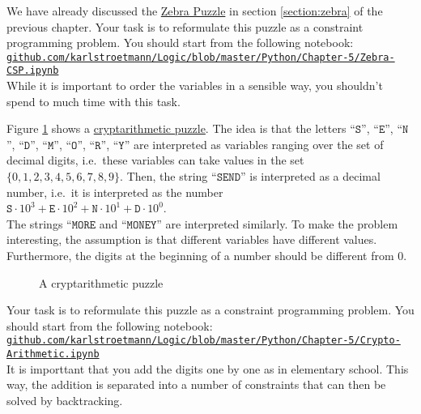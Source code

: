 \exerciseEng
We have already discussed the \href{https://en.wikipedia.org/wiki/Zebra_puzzle}{Zebra Puzzle} in section
\ref{section:zebra} of the previous chapter.  Your task is to reformulate this puzzle as a constraint
programming problem.  You should start from the following notebook:
\\[0.2cm]
\hspace*{1.3cm}
\href{https://github.com/karlstroetmann/Logic/blob/master/Python/Chapter-4/Prince-Tiger.ipynb}{\texttt{github.com/karlstroetmann/Logic/blob/master/Python/Chapter-5/Zebra-CSP.ipynb}}
\\[0.2cm]
While it is important to order the variables in a sensible way, you shouldn't spend to much time with this
task.
\eox

\exerciseEng
Figure \ref{fig:send-more-money.pdf} shows a
\href{https://en.wikipedia.org/wiki/Verbal_arithmetic}{cryptarithmetic puzzle}.
The idea is that the letters 
``$\texttt{S}$'', ``$\texttt{E}$'', ``$\texttt{N}$'', ``$\texttt{D}$'', ``$\texttt{M}$'', ``$\texttt{O}$'', ``$\texttt{R}$'', ``$\texttt{Y}$'' 
are interpreted as variables ranging over the set of decimal digits, i.e.~these variables can take values in
the set $\{0,1,2,3,4,5,6,7,8,9\}$.  Then, the string ``$\texttt{SEND}$'' is interpreted as a decimal number,
i.e.~it is interpreted as the number
\\[0.2cm]
\hspace*{1.3cm}
$\texttt{S} \cdot 10^3 + \texttt{E} \cdot 10^2 + \texttt{N} \cdot 10^1 + \texttt{D} \cdot 10^0$.
\\[0.2cm]
The strings ``$\texttt{MORE}$ and ``$\texttt{MONEY}$'' are interpreted similarly. To make the problem
interesting, the assumption is that different variables have different values.  Furthermore, the
digits at the beginning of a number should be different from $0$.


\begin{figure}[!ht]
\centering
{}

\caption{A cryptarithmetic puzzle}
\label{fig:send-more-money.pdf}
\end{figure}

Your task is to reformulate this puzzle as a constraint
programming problem.  You should start from the following notebook:
\\[0.2cm]
\hspace*{0.3cm}
\href{https://github.com/karlstroetmann/Logic/blob/master/Python/Chapter-5/Crypto-Arithmetic.ipynb}{\texttt{github.com/karlstroetmann/Logic/blob/master/Python/Chapter-5/Crypto-Arithmetic.ipynb}}
\\[0.2cm]
It is importtant that you add the digits one by one as in elementary school.  This way, the addition is
separated into a number of constraints that can then be solved by backtracking.  \eox

